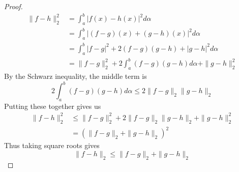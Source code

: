 \documentclass[11pt]{article}
\begin{document}
\begin{exercise}{6.11}
    \begin{proof}
        \begin{equation*}
        \begin{split}
            \| f -h \|_2^2 & = \int_a^b |f(x) - h(x)|^2 d \alpha \\
            & = \int_a^b |(f - g)(x) + (g - h)(x)|^2 d \alpha \\
            & = \int_a^b |f - g|^2 + 2(f - g)(g - h) + |g - h|^2 d \alpha \\
            & = \| f - g \|_2^2 + 2 \int_a^b (f - g)(g - h) d \alpha + \| g - h \|_2^2
        \end{split}
    \end{equation*}
    By the Schwarz inequality, the middle term is $$2 \int_a^b (f - g)(g - h) d \alpha \le 2 \| f - g \|_2 \| g - h \|_2$$ Putting these together gives us \begin{equation*}
        \begin{split}
            \| f - h \|_2^2 & \le \| f - g \|_2^2 + 2 \| f - g \|_2 \| g - h \|_2 + \| g - h \|_2^2 \\
            & = (\| f - g\|_2 + \| g - h \|_2)^2
        \end{split}
    \end{equation*}
    Thus taking square roots gives $$\| f - h \|_2 \le \| f - g \|_2 + \| g- h\|_2$$
    \end{proof}
\end{exercise}
\end{document}
